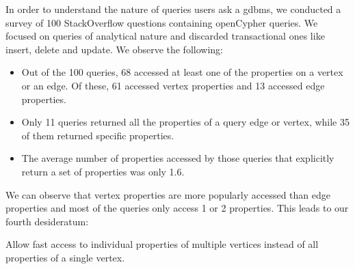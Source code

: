 \begin{guideline}
	In order to understand the nature of queries users ask a \gls{gdbms}, we conducted a survey of 100 StackOverflow questions containing openCypher queries. We focused on queries of analytical nature and discarded transactional ones like insert, delete and update. We observe the following: 
	
	
	\begin{itemize}
		
		\item Out of the 100 queries, 68 accessed at least one of the properties on a vertex or an edge. Of these, 61 accessed vertex properties and 13 accessed edge properties.
		
		\item Only 11 queries returned all the properties of a query edge or vertex, while 35 of them returned specific properties.
		
		\item The average number of properties accessed by those queries that explicitly return a set of properties was only 1.6.
		
	\end{itemize}
	
	We can observe that vertex properties are more popularly accessed than edge properties and most of the queries only access 1 or 2 properties. This leads to our fourth desideratum:
	
	\begin{desideratum}
		Allow fast access to individual properties of multiple vertices instead of all properties of a single vertex.
	\end{desideratum}
	
\end{guideline}
